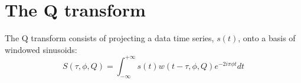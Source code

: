 \section{The Q transform} \label{sec:qtransform}

The Q transform consists of projecting a data time series, $s(t)$, onto a basis of windowed sinusoids:
\begin{equation}
  S(\tau, \phi, Q) = \int_{-\infty}^{+\infty}{ s(t) w(t-\tau,\phi,Q) e^{-2i\pi\phi t}dt}
\end{equation}

